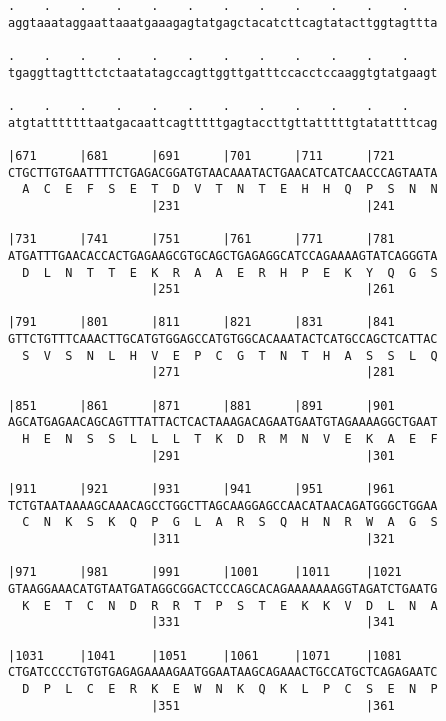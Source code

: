 \documentclass{article}
\begin{document}
\begin{Verbatim}
.    .    .    .    .    .    .    .    .    .    .    .    
aggtaaataggaattaaatgaaagagtatgagctacatcttcagtatacttggtagttta
                                                            
.    .    .    .    .    .    .    .    .    .    .    .    
tgaggttagtttctctaatatagccagttggttgatttccacctccaaggtgtatgaagt
                                                            
.    .    .    .    .    .    .    .    .    .    .    .    
atgtatttttttaatgacaattcagtttttgagtaccttgttatttttgtatattttcag
                                                            
|671      |681      |691      |701      |711      |721      
CTGCTTGTGAATTTTCTGAGACGGATGTAACAAATACTGAACATCATCAACCCAGTAATA
  A  C  E  F  S  E  T  D  V  T  N  T  E  H  H  Q  P  S  N  N
                    |231                          |241      
  
|731      |741      |751      |761      |771      |781      
ATGATTTGAACACCACTGAGAAGCGTGCAGCTGAGAGGCATCCAGAAAAGTATCAGGGTA
  D  L  N  T  T  E  K  R  A  A  E  R  H  P  E  K  Y  Q  G  S
                    |251                          |261      
  
|791      |801      |811      |821      |831      |841      
GTTCTGTTTCAAACTTGCATGTGGAGCCATGTGGCACAAATACTCATGCCAGCTCATTAC
  S  V  S  N  L  H  V  E  P  C  G  T  N  T  H  A  S  S  L  Q
                    |271                          |281      
  
|851      |861      |871      |881      |891      |901      
AGCATGAGAACAGCAGTTTATTACTCACTAAAGACAGAATGAATGTAGAAAAGGCTGAAT
  H  E  N  S  S  L  L  L  T  K  D  R  M  N  V  E  K  A  E  F
                    |291                          |301      
  
|911      |921      |931      |941      |951      |961      
TCTGTAATAAAAGCAAACAGCCTGGCTTAGCAAGGAGCCAACATAACAGATGGGCTGGAA
  C  N  K  S  K  Q  P  G  L  A  R  S  Q  H  N  R  W  A  G  S
                    |311                          |321      
  
|971      |981      |991      |1001     |1011     |1021     
GTAAGGAAACATGTAATGATAGGCGGACTCCCAGCACAGAAAAAAAGGTAGATCTGAATG
  K  E  T  C  N  D  R  R  T  P  S  T  E  K  K  V  D  L  N  A
                    |331                          |341      
  
|1031     |1041     |1051     |1061     |1071     |1081     
CTGATCCCCTGTGTGAGAGAAAAGAATGGAATAAGCAGAAACTGCCATGCTCAGAGAATC
  D  P  L  C  E  R  K  E  W  N  K  Q  K  L  P  C  S  E  N  P
                    |351                          |361      
  

\end{Verbatim}
\end{document}
